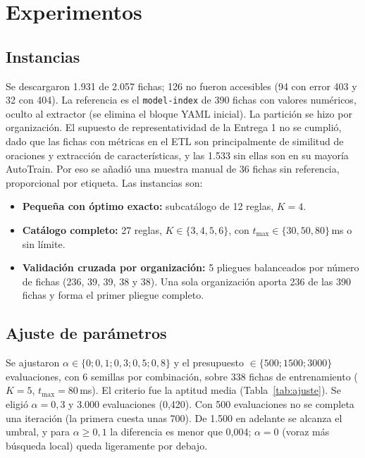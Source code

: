 \documentclass[conference]{IEEEtran}
\begin{document}
	\section{Experimentos}
	
	\subsection{Instancias}
	Se descargaron 1.931 de 2.057 fichas; 126 no fueron accesibles (94 con error 403 y 32 con 404). La referencia es el \texttt{model-index} de 390 fichas con valores num\'ericos, oculto al extractor (se elimina el bloque YAML inicial). La partici\'on se hizo por organizaci\'on. El supuesto de representatividad de la Entrega 1 no se cumplió, dado que las fichas con m\'etricas en el ETL son principalmente de similitud de oraciones y extracci\'on de caracter\'isticas, y las 1.533 sin ellas son en su mayor\'ia AutoTrain. Por eso se a\~nadi\'o una muestra manual de 36 fichas sin referencia, proporcional por etiqueta. Las instancias son:
	\begin{itemize}
		\item \textbf{Peque\~na con \'optimo exacto:} subcat\'alogo de 12 reglas, $K=4$.
		\item \textbf{Cat\'alogo completo:} 27 reglas, $K\in\{3,4,5,6\}$, con $t_{\max}\in\{30,50,80\}$\,ms o sin l\'imite.
		\item \textbf{Validaci\'on cruzada por organizaci\'on:} 5 pliegues balanceados por n\'umero de fichas (236, 39, 39, 38 y 38). Una sola organizaci\'on aporta 236 de las 390 fichas y forma el primer pliegue completo.
	\end{itemize}
	
	\subsection{Ajuste de par\'ametros}
	Se ajustaron $\alpha\in\{0;0{,}1;0{,}3;0{,}5;0{,}8\}$ y el presupuesto $\in\{500;1500;3000\}$ evaluaciones, con 6 semillas por combinaci\'on, sobre 338 fichas de entrenamiento ($K=5$, $t_{\max}=80$\,ms). El criterio fue la aptitud media (Tabla~\ref{tab:ajuste}). Se eligi\'o $\alpha=0{,}3$ y 3.000 evaluaciones (0,420). Con 500 evaluaciones no se completa una iteraci\'on (la primera cuesta unas 700). De 1.500 en adelante se alcanza el umbral, y para $\alpha\ge0{,}1$ la diferencia es menor que 0,004; $\alpha=0$ (voraz m\'as b\'usqueda local) queda ligeramente por debajo.
	
\end{document}
